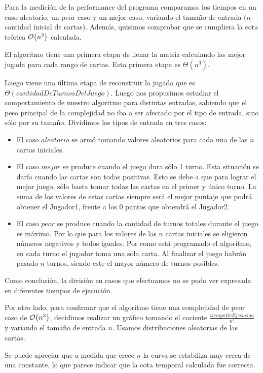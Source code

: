 \documentclass[11pt, a4paper, twoside]{article}
\begin{document}
{}

Para la medición de la performance del programa comparamos los tiempos en un caso aleatorio, un peor caso y 
un mejor caso, variando el tamaño de entrada ($n$ cantidad inicial de cartas). Además, quisimos comprobar que se 
cumpliera la cota teórica $\mathop{}\mathopen{}\mathcal{O}\mathopen{}\left(n^3\right)$ calculada. 

El algoritmo tiene una primera etapa de llenar la matriz calculando las mejor jugada para cada rango de cartas. Esta primera etapa es $\Theta(n^3)$.

Luego viene una última etapa de reconstruir la jugada que es $\Theta(cantidadDeTurnosDelJuego)$. Luego nos propusimos estudiar el comportamiento de nuestro algoritmo para distintas entradas, sabiendo que el peso principal de la complejidad no iba a ser afectado por el tipo de entrada, sino sólo por su tamaño. Dividimos los tipos de entrada en tres casos: 
 
\begin{itemize}
\item El caso $aleatorio$ se armó tomando valores aleatorios para cada una de las $n$ cartas iniciales. 
\item El caso $mejor$ se produce cuando el juego dura sólo 1 turno. Esta situación se daría cuando las cartas son 
todas positivas. Esto se debe a que para lograr el mejor juego, sólo basta tomar todas las cartas en el primer y 
único turno. La suma de los valores de estas cartas siempre será el mejor puntaje que podrá obtener 
el Jugador1, frente a los 0 puntos que obtendrá el Jugador2. 
\item El caso $peor$ se produce cuando la cantidad de turnos totales durante el juego es máximo. 
Por lo que para los valores de las $n$ cartas iniciales se eligieron números negativos y todos iguales. 
Por como está programado el algoritmo, en cada turno el jugador toma una sola carta. Al finalizar el juego habrán pasado $n$ turnos, 
siendo este el mayor número de turnos posibles.
\end{itemize}


Como conclusión, la división en casos que efectuamos no se pudo ver expresada en diferentes tiempos de ejecución.

Por otro lado, para confirmar que el algoritmo tiene una complejidad de peor caso de $\mathop{}\mathopen{}\mathcal{O}\mathopen{}\left(n^3\right)$, decidimos 
realizar un gráfico tomando el cociente $\frac{tiempoDeEjecuci\acute{o}n}{n^3}$ y variando el tamaño de entrada $n$. Usamos distribuciones aleatorias de las cartas.

Se puede apreciar que a medida que crece $n$ la curva se estabiliza muy cerca de una constante, lo que parece indicar que la cota temporal calculada fue correcta. 

  
\end{document}
